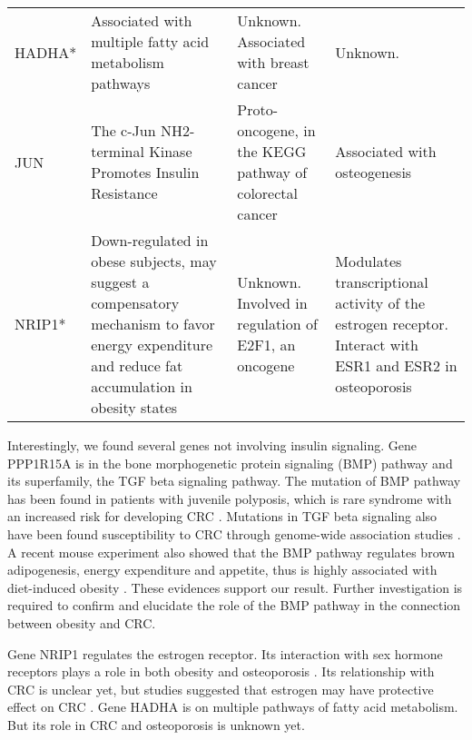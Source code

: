 \begin{sidewaystable}[h]
\begin{tabular}{l|m{4.5cm}|m{4.5cm}|m{4.5cm}}
HADHA*    & Associated with multiple fatty acid metabolism pathways \cite{liberzon2011molecular}                                                                                          & Unknown. Associated with breast cancer \cite{mamtani2012association}                                                    & Unknown.                                                                                                                            \\
JUN       & The c-Jun NH2-terminal Kinase Promotes Insulin Resistance \cite{aguirre2000c}                                                                                      & Proto-oncogene, in the KEGG pathway of colorectal cancer \cite{kanehisa2000kegg}                                 & Associated with osteogenesis \cite{lewinson2003stimulation,krzeszinski2014mir}                                                                                           \\
NRIP1*    & Down-regulated in obese subjects, may suggest a compensatory mechanism to favor energy expenditure and reduce fat accumulation in obesity states \cite{catalan2009rip140} & Unknown. Involved in regulation of E2F1, an oncogene \cite{docquier2010transcriptional}                                      & Modulates transcriptional activity of the estrogen receptor. Interact with ESR1 and ESR2 in osteoporosis \cite{moron2006multilocus}\\\hline
\end{tabular}
\end{sidewaystable}


Interestingly, we found several genes not involving insulin signaling. Gene PPP1R15A is in the bone morphogenetic
protein signaling (BMP) pathway and its superfamily, the TGF beta signaling pathway. The mutation of BMP pathway has been found in patients with juvenile polyposis, which is rare syndrome with an increased risk for developing CRC \cite{howe2001germline,brosens2007risk}. Mutations in TGF beta signaling also have been found susceptibility to CRC through genome-wide association studies \cite{bellam2010tgf}. A recent mouse experiment also showed that the BMP pathway regulates brown adipogenesis, energy expenditure and appetite, thus is highly associated with diet-induced obesity \cite{townsend2012bone}. These evidences support our result. Further investigation is required to confirm and elucidate the role of the BMP pathway in the connection between obesity and CRC.

Gene NRIP1 regulates the estrogen receptor. Its interaction with sex hormone receptors plays a role in both obesity \cite{catalan2009rip140} and osteoporosis \cite{moron2006multilocus}. Its relationship with CRC is unclear yet, but studies suggested that estrogen may have protective effect on CRC \cite{barzi2013molecular}. Gene HADHA is on multiple pathways of fatty acid metabolism. But its role in CRC and osteoporosis is unknown yet.

